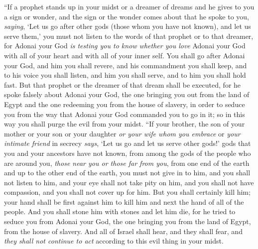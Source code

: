 \begin{biblechapter} %
\verse “If a prophet stands up in your midst or a dreamer of dreams and he gives to you a sign or wonder,
\verse and the sign or the wonder comes about that he spoke to you, \textit{saying}, ‘Let us go after other gods (those whom you have not known), and let us serve them,’
\verse you must not listen to the words of that prophet or to that dreamer, for Adonai your God \textit{is testing you to know whether you love} Adonai your God with all of your heart and with all of your inner self.
\verse You shall go after Adonai your God, and him you shall revere, and his commandment you shall keep, and to his voice you shall listen, and him you shall serve, and to him you shall hold fast.
\verse But that prophet or the dreamer of that dream shall be executed, for he spoke falsely about Adonai your God, the one bringing you out from the land of Egypt and the one redeeming you from the house of slavery, in order to seduce you from the way that Adonai your God commanded you to go in it; so in this way you shall purge the evil from your midst.
\verse “If your brother, the son of your mother or your son or your daughter \textit{or your wife whom you embrace} or \textit{your intimate friend} in secrecy \textit{says}, ‘Let us go and let us serve other gods!’ gods that you and your ancestors have not known,
\verse from among the gods of the people who are around you, \textit{those near you or those far from you}, from one end of the earth and up to the other end of the earth,
\verse you must not give in to him, and you shall not listen to him, and your eye shall not take pity on him, and you shall not have compassion, and you shall not cover up for him.
\verse But you shall certainly kill him; your hand shall be first against him to kill him and next the hand of all of the people.
\verse And you shall stone him with stones and let him die, for he tried to seduce you from Adonai your God, the one bringing you from the land of Egypt, from the house of slavery.
\verse And all of Israel shall hear, and they shall fear, and \textit{they shall not continue to act} according to this evil thing in your midst.

\end{biblechapter}
